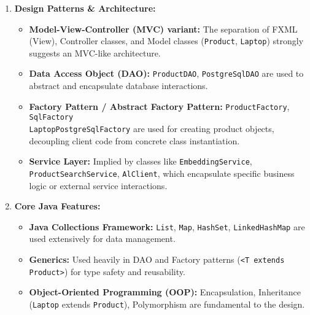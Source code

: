 \documentclass{article}
\begin{document}
\begin{enumerate}
\begin{itemize}
    \end{itemize}
    \item \textbf{Design Patterns \& Architecture:}
    \begin{itemize}
        \item \textbf{Model-View-Controller (MVC) variant:} The separation of FXML (View), Controller classes, and Model classes (\texttt{Product}, \texttt{Laptop}) strongly suggests an MVC-like architecture.
        \item \textbf{Data Access Object (DAO):} \texttt{ProductDAO}, \texttt{PostgreSqlDAO} are used to abstract and encapsulate database interactions.
        \item \textbf{Factory Pattern / Abstract Factory Pattern:} \texttt{ProductFactory}, \texttt{SqlFactory} \\\texttt{LaptopPostgreSqlFactory} are used for creating product objects, decoupling client code from concrete class instantiation.
        \item \textbf{Service Layer:} Implied by classes like \texttt{EmbeddingService}, \texttt{ProductSearchService}, \texttt{AlClient}, which encapsulate specific business logic or external service interactions.
    \end{itemize}
    \item \textbf{Core Java Features:}
    \begin{itemize}
        \item \textbf{Java Collections Framework:} \texttt{List}, \texttt{Map}, \texttt{HashSet}, \texttt{LinkedHashMap} are used extensively for data management.
        \item \textbf{Generics:} Used heavily in DAO and Factory patterns (\texttt{<T extends Product>}) for type safety and reusability.
        \item \textbf{Object-Oriented Programming (OOP):} Encapsulation, Inheritance (\texttt{Laptop} extends \texttt{Product}), Polymorphism are fundamental to the design.
    \end{itemize}
\end{enumerate}
\end{document}
